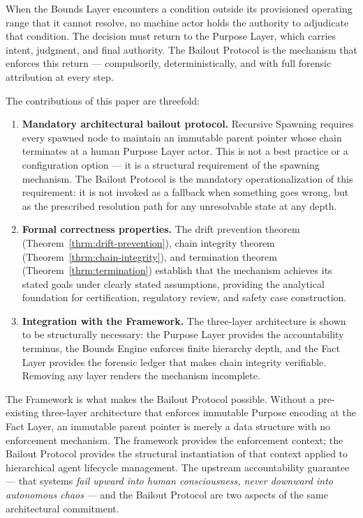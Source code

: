 When the Bounds Layer encounters a condition outside its provisioned operating range that it cannot resolve, no machine actor holds the authority to adjudicate that condition. The decision must return to the Purpose Layer, which carries intent, judgment, and final authority. The Bailout Protocol is the mechanism that enforces this return --- compulsorily, deterministically, and with full forensic attribution at every step.

The contributions of this paper are threefold:

\begin{enumerate}
  \itemsep0em
  \item \textbf{Mandatory architectural bailout protocol.} Recursive Spawning requires every spawned node to maintain an immutable parent pointer whose chain terminates at a human Purpose Layer actor. This is not a best practice or a configuration option --- it is a structural requirement of the spawning mechanism. The Bailout Protocol is the mandatory operationalization of this requirement: it is not invoked as a fallback when something goes wrong, but as the prescribed resolution path for any unresolvable state at any depth.

  \item \textbf{Formal correctness properties.} The drift prevention theorem (Theorem~\ref{thrm:drift-prevention}), chain integrity theorem (Theorem~\ref{thrm:chain-integrity}), and termination theorem (Theorem~\ref{thrm:termination}) establish that the mechanism achieves its stated goals under clearly stated assumptions, providing the analytical foundation for certification, regulatory review, and safety case construction.

  \item \textbf{Integration with the \bxthree{} Framework.} The three-layer architecture is shown to be structurally necessary: the Purpose Layer provides the accountability terminus, the Bounds Engine enforces finite hierarchy depth, and the Fact Layer provides the forensic ledger that makes chain integrity verifiable. Removing any layer renders the mechanism incomplete.
\end{enumerate}

The \bxthree{} Framework is what makes the Bailout Protocol possible. Without a pre-existing three-layer architecture that enforces immutable Purpose encoding at the Fact Layer, an immutable parent pointer is merely a data structure with no enforcement mechanism. The framework provides the enforcement context; the Bailout Protocol provides the structural instantiation of that context applied to hierarchical agent lifecycle management. The upstream accountability guarantee --- that \bxthree{} systems \emph{fail upward into human consciousness, never downward into autonomous chaos} --- and the Bailout Protocol are two aspects of the same architectural commitment.

